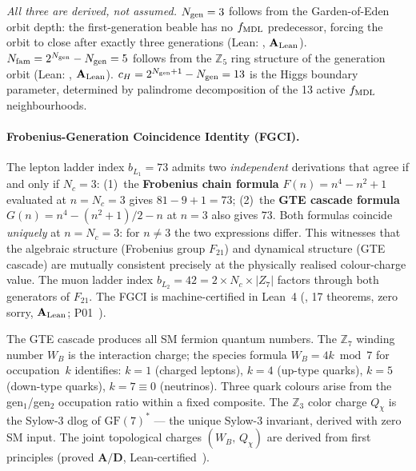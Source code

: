 \emph{All three are derived, not assumed.}  $N_{\rm gen} = 3$ follows from the
Garden-of-Eden orbit depth: the first-generation beable has no $f_{\rm MDL}$
predecessor, forcing the orbit to close after exactly three generations
(Lean: , $\mathbf{A}_{\rm Lean}$).
$N_{\rm fam} = 2^{N_{\rm gen}} - N_{\rm gen} = 5$ follows from the $\mathbb{Z}_5$
ring structure of the generation orbit (Lean:
, $\mathbf{A}_{\rm Lean}$).
$c_H = 2^{N_{\rm gen}+1} - N_{\rm gen} = 13$ is the Higgs boundary parameter,
determined by palindrome decomposition of the 13 active $f_{\rm MDL}$
neighbourhoods.

\paragraph{Frobenius-Generation Coincidence Identity (FGCI).}
The lepton ladder index $b_{L_1} = 73$ admits two \emph{independent} derivations
that agree if and only if $N_c = 3$:
(1)~the \textbf{Frobenius chain formula} $F(n) = n^4 - n^2 + 1$ evaluated at
$n = N_c = 3$ gives $81 - 9 + 1 = 73$;
(2)~the \textbf{GTE cascade formula} $G(n) = n^4 - (n^2+1)/2 - n$ at $n=3$
also gives $73$.  Both formulas coincide \emph{uniquely} at $n = N_c = 3$:
for $n \neq 3$ the two expressions differ.  This witnesses that the algebraic
structure (Frobenius group $F_{21}$) and dynamical structure (GTE cascade)
are mutually consistent precisely at the physically realised colour-charge value.
The muon ladder index $b_{L_2} = 42 = 2 \times N_c \times |Z_7|$ factors through
both generators of $F_{21}$.  The FGCI is machine-certified in Lean~4
(, 17 theorems, zero sorry, $\mathbf{A}_{\rm Lean}$;
P01~\cite{SpivackSM}).

The GTE cascade produces all SM fermion quantum numbers.  The $\mathbb{Z}_7$
winding number $W_B$ is the interaction charge; the species formula
$W_B = 4k \bmod 7$ for occupation~$k$ identifies: $k{=}1$ (charged leptons),
$k{=}4$ (up-type quarks), $k{=}5$ (down-type quarks), $k{=}7\equiv 0$ (neutrinos).
Three quark colours arise from the gen$_1$/gen$_2$ occupation ratio within a fixed
composite.  The $\mathbb{Z}_3$ color charge $Q_\chi$ is the Sylow-3 dlog of
$\mathrm{GF}(7)^*$ --- the unique Sylow-3 invariant, derived with zero SM input.
The joint topological charges $(W_B,\, Q_\chi)$ are derived from first principles
(proved $\mathbf{A/D}$, Lean-certified~\cite{SpivackGTEUnification}).


